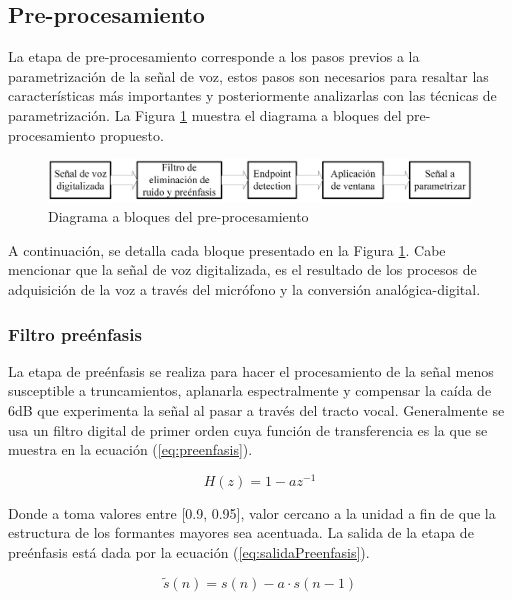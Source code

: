 \subsection{Pre-procesamiento}

La etapa de pre-procesamiento corresponde a los pasos previos a la parametrización de la señal de voz, estos pasos son necesarios para resaltar las características más importantes y posteriormente analizarlas con las técnicas de parametrización. La Figura \ref{fig:preProcesamiento} muestra el diagrama a bloques del pre-procesamiento propuesto.

\begin{figure}[H]
	\centering
	\includegraphics[width=0.9\linewidth]{figures/preProcesamiento}
	\caption{Diagrama a bloques del pre-procesamiento}
	\label{fig:preProcesamiento}
\end{figure}

A continuación, se detalla cada bloque presentado en la Figura \ref{fig:preProcesamiento}. Cabe mencionar que la señal de voz digitalizada, es el resultado de los procesos de adquisición de la voz a través del micrófono y la conversión analógica-digital.

\subsubsection{Filtro preénfasis}

La etapa de preénfasis se realiza para hacer el procesamiento de la señal menos susceptible a truncamientos, aplanarla espectralmente y compensar la caída de 6dB que experimenta la señal al pasar a través del tracto vocal. Generalmente se usa un filtro digital de primer orden cuya función de transferencia es la que se muestra en la ecuación (\ref{eq:preenfasis}). \cite{SalcedoCherubini2006}

\begin{equation}\label{eq:preenfasis}
	H(z)=1-az^{-1}
\end{equation}

Donde a toma valores entre [0.9, 0.95], valor cercano a la unidad a fin de que la estructura de los formantes mayores sea acentuada. La salida de la etapa de preénfasis está dada por la ecuación (\ref{eq:salidaPreenfasis}).

\begin{equation}\label{eq:salidaPreenfasis}
	\tilde{s}(n)=s(n)-a\cdot s(n-1)
\end{equation}

